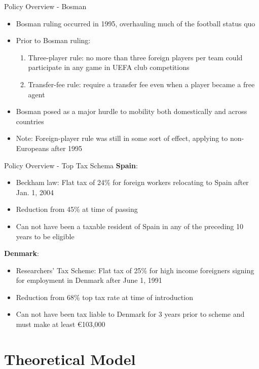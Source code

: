 \documentclass[aspectratio=169,professionalfonts]{beamer}
\newcommand{\hl}[1]{\textbf{\textcolor{UGARed}{#1}}}
\newcommand{\hl}[1]{\textbf{\color{UGARed}{#1}}}
\begin{document}
\begin{frame}{Policy Overview - Bosman}
  \begin{itemize}
    \item Bosman ruling occurred in 1995, overhauling much of the football status quo
    \item Prior to Bosman ruling:
    \begin{enumerate}
      \item Three-player rule: no more than three foreign players per team could participate in any game in UEFA club competitions
      \item Transfer-fee rule: require a transfer fee even when a player became a free agent
    \end{enumerate}
    \item Bosman posed as a major hurdle to mobility both domestically and across countries
    \item Note: Foreign-player rule was still in some sort of effect, applying to non-Europeans after 1995
  \end{itemize}
\end{frame}

\begin{frame}{Policy Overview - Top Tax Schema}
  \hl{Spain}:
  \begin{itemize}
    \item Beckham law: Flat tax of 24\% for foreign workers relocating to Spain after Jan. 1, 2004
    \item Reduction from 45\% at time of passing
    \item Can not have been a taxable resident of Spain in any of the preceding 10 years to be eligible
  \end{itemize}
  \hl{Denmark}:
  \begin{itemize}
    \item Researchers' Tax Scheme: Flat tax of 25\% for high income foreigners signing for employment in Denmark after June 1, 1991
    \item Reduction from 68\% top tax rate at time of introduction
    \item Can not have been tax liable to Denmark for 3 years prior to scheme and must make at least \euro 103,000
  \end{itemize}
\end{frame}

\section{Theoretical Model}
\end{document}

